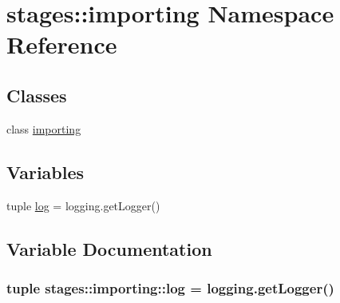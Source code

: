 \hypertarget{namespacestages_1_1importing}{\section{stages\-:\-:importing \-Namespace \-Reference}
\label{namespacestages_1_1importing}
}
\subsection*{\-Classes}
\begin{DoxyCompactItemize}
\item 
class \hyperlink{classstages_1_1importing_1_1importing}{importing}
\end{DoxyCompactItemize}
\subsection*{\-Variables}
\begin{DoxyCompactItemize}
\item 
tuple \hyperlink{namespacestages_1_1importing_af585b8c9cdb9a40322931414beac4bc1}{log} = logging.\-get\-Logger()
\end{DoxyCompactItemize}


\subsection{\-Variable \-Documentation}
\hypertarget{namespacestages_1_1importing_af585b8c9cdb9a40322931414beac4bc1}{
\subsubsection[{log}]{\setlength{\rightskip}{0pt plus 5cm}tuple {\bf stages\-::importing\-::log} = logging.\-get\-Logger()}}\label{namespacestages_1_1importing_af585b8c9cdb9a40322931414beac4bc1}
